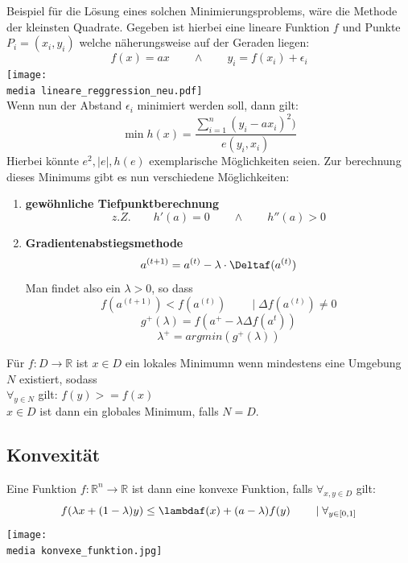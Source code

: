 	\begin{theorem}
	Beispiel für die Lösung eines solchen Minimierungsproblems, wäre die Methode der kleinsten Quadrate.
 Gegeben ist hierbei eine lineare Funktion $f$ und Punkte $P_i=(x_i,y_i)$ welche näherungsweise auf der Geraden liegen:
	\[f(x)=ax \qquad\wedge\qquad y_i=f(x_i)+\epsilon_i\]
     \texttt{[image: \\media lineare\_reggression\_neu.pdf]}
	\\
	Wenn nun der Abstand $\epsilon_i$ minimiert werden soll, dann gilt:
	\[\min h(x)=\frac{\sum_{i=1}^n(y_i-ax_i)^2)}{e(y_i,x_i)}\]
	Hierbei könnte $e^2,\mid e\mid, h(e)$ exemplarische Möglichkeiten seien. Zur berechnung dieses 		Minimums gibt es nun verschiedene Möglichkeiten:\\
	\begin{enumerate}
		\item \textbf{gewöhnliche Tiefpunktberechnung} \[z.Z.\qquad h'(a)=0\qquad \wedge\qquad h''(a)>0\]
		\item \textbf{Gradientenabstiegsmethode}
		\[a^{(t+1)}=a^{(t)}-\lambda\cdot\Deltaf(a^{(t)})\]
		Man findet also ein $\lambda>0$, so dass
		\[f(a^{(t+1)})<f(a^{(t)})\qquad\mid \Delta f(a^{(t)})\neq 0\]
		\[g^{+}(\lambda)=f(a^+-\lambda\Delta f(a^t))\]
		\[\lambda^+=argmin(g^+(\lambda))\]		
	\end{enumerate}
	\begin{Def}
	Für $f: D\rightarrow \mathbb{R}$ ist $x\in D$ ein lokales Minimumn wenn mindestens eine Umgebung $N$ existiert, sodass \\$\forall_{y\in N}$ gilt: $f(y)>=f(x)$\\
	$x\in D$ ist dann ein globales Minimum, falls $N=D$.
	\subsection{Konvexität}
	\begin{Def}
	Eine Funktion $f: \mathbb{R}^n\rightarrow\mathbb{R}$ ist dann eine konvexe Funktion, falls $\forall_{x,y\in D}$ gilt: 
	\[f(\lambda x+(1-\lambda)y)\leq\lambdaf(x)+(a-\lambda)f(y)\qquad\mid \forall_{y\in[0,1]}\]
     \texttt{[image: \\media konvexe\_funktion.jpg]}
\\

\end{Def}
\end{Def}
\end{theorem}

